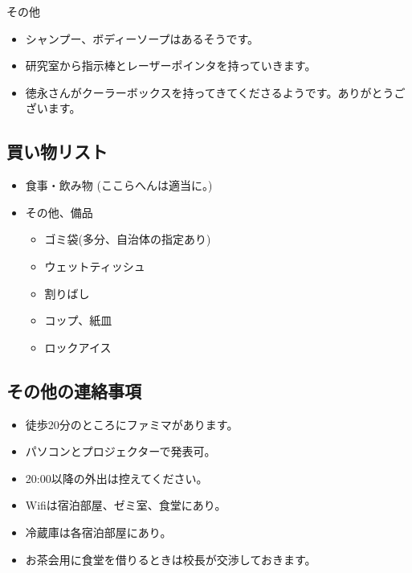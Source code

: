 \documentclass[unicode,a4paper,11pt]{ltjsarticle}
\begin{document}
その他

\begin{itemize}
      \item
            シャンプー、ボディーソープはあるそうです。
      \item
            研究室から指示棒とレーザーポインタを持っていきます。
      \item
            徳永さんがクーラーボックスを持ってきてくださるようです。ありがとうございます。
\end{itemize}

\subsection*{買い物リスト}

\begin{itemize}
      \item
            食事・飲み物 (ここらへんは適当に。)
      \item
            その他、備品
            \begin{itemize}
                  \item
                        ゴミ袋(多分、自治体の指定あり)
                  \item
                        ウェットティッシュ
                  \item
                        割りばし
                  \item
                        コップ、紙皿
                  \item
                        ロックアイス
            \end{itemize}
\end{itemize}

\subsection*{その他の連絡事項}

\begin{itemize}
      \item
            徒歩20分のところにファミマがあります。
      \item
            パソコンとプロジェクターで発表可。
      \item
            20:00以降の外出は控えてください。
      \item
            Wifiは宿泊部屋、ゼミ室、食堂にあり。
      \item
            冷蔵庫は各宿泊部屋にあり。
      \item
            お茶会用に食堂を借りるときは校長が交渉しておきます。
\end{itemize}
\end{document}
